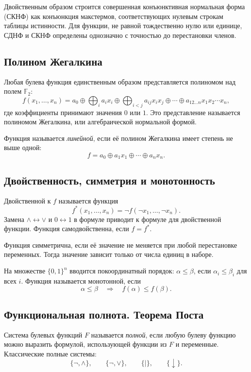 Двойственным образом строится совершенная конъюнктивная нормальная форма (СКНФ)
как конъюнкция макстермов, соответствующих нулевым строкам таблицы истинности.
Для функции, не равной тождественно нулю или единице, СДНФ и СКНФ определены
однозначно с точностью до перестановки членов.

\subsection{Полином Жегалкина}

Любая булева функция единственным образом представляется полиномом над полем
$\mathbb{F}_2$:
\[
 f(x_1,\ldots,x_n)=
 a_0\oplus
 \bigoplus_i a_i x_i\oplus
 \bigoplus_{i<j}a_{ij}x_ix_j\oplus\cdots\oplus
 a_{12\ldots n}x_1x_2\cdots x_n,
\]
где коэффициенты принимают значения $0$ или $1$. Это представление называется
полиномом Жегалкина, или алгебраической нормальной формой.

Функция называется \emph{линейной}, если её полином Жегалкина имеет степень не выше
одной:
\[
    f=a_0\oplus a_1x_1\oplus\cdots\oplus a_nx_n.
\]

\subsection{Двойственность, симметрия и монотонность}

Двойственной к $f$ называется функция
\[
    f^*(x_1,\ldots,x_n)=\neg f(\neg x_1,\ldots,\neg x_n).
\]
Замена $\land\leftrightarrow\lor$ и $0\leftrightarrow1$ в формуле приводит к
формуле для двойственной функции. Функция самодвойственна, если $f=f^*$.

Функция симметрична, если её значение не меняется при любой перестановке
переменных. Тогда значение зависит только от числа единиц в наборе.

На множестве $\{0,1\}^n$ вводится покоординатный порядок:
$\alpha\leq\beta$, если $\alpha_i\leq\beta_i$ для всех $i$.
Функция называется монотонной, если
\[
    \alpha\leq\beta\quad\Longrightarrow\quad f(\alpha)\leq f(\beta).
\]

\subsection{Функциональная полнота. Теорема Поста}

Система булевых функций $F$ называется \emph{полной}, если любую булеву функцию
можно выразить формулой, использующей функции из $F$ и переменные.
Классические полные системы:
\[
    \{\neg,\land\},\qquad \{\neg,\lor\},\qquad
    \{\mid\},\qquad \{\downarrow\}.
\]

